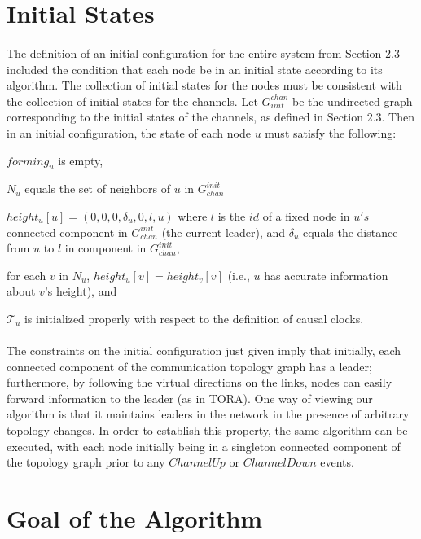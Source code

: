 \section{Initial States}
\paragraph{}The definition of an initial configuration for the entire system from Section 2.3 included the condition that each node be in an initial state according to its algorithm. The collection of initial states for the nodes must be consistent with the collection of initial states for the channels. Let $G_{init} ^{chan}$ be the undirected graph corresponding to the initial states of the channels, as defined in Section 2.3. Then in an initial configuration, the state of each node $u$ must satisfy the following:
\begin{list}{--}{}
	\item $forming_u$ is empty,
	\item $N_u$ equals the set of neighbors of $u$ in $G ^{init} _{chan}$
	\item $height_u[u] = (0, 0, 0, \delta _u , 0, l, u)$ where $l$ is the $id$ of a fixed node in $u's$ connected component in $G^{init} _{chan}$ (the current leader), and $\delta _u$ equals the distance from $u$ to $l$ in component in $G^{init} _{chan}$,
	\item for each $v$ in $N_u$, $height_u[v] = height_v[v]$ (i.e., $u$ has accurate information about $v$’s height), and
	\item $\mathcal{T} _u$ is initialized properly with respect to the definition of causal clocks.
\end{list}
\paragraph{}The constraints on the initial configuration just given imply that initially, each connected component of the communication topology graph has a leader; furthermore, by following the virtual directions on the links, nodes can easily forward information to the leader (as in TORA). One way of viewing our algorithm is that it maintains leaders in the network in the presence of arbitrary topology changes. In order to establish this property, the same algorithm can be executed, with each node initially being in a singleton connected component of the topology graph prior to any $ChannelUp$ or $ChannelDown$ events.
\section{Goal of the Algorithm}
